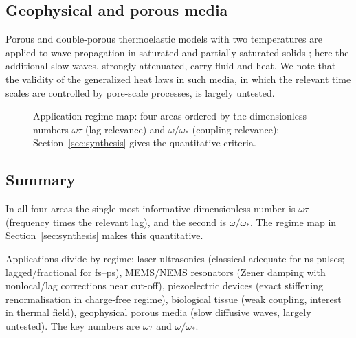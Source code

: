 \subsection{Geophysical and porous media}
Porous and double-porous thermoelastic models with two temperatures are applied to wave propagation in saturated and partially saturated solids \citep{Singh2020,Kumar2022,Kumar2025}; here the additional slow waves, strongly attenuated, carry fluid and heat. We note that the validity of the generalized heat laws in such media, in which the relevant time scales are controlled by pore-scale processes, is largely untested.

\begin{figure}[t!]\centering\small

\caption{Application regime map: four areas ordered by the dimensionless numbers $\omega\tau$ (lag relevance) and $\omega/\omega_*$ (coupling relevance); Section~\ref{sec:synthesis} gives the quantitative criteria.}\label{fig:applications-geo}
\end{figure}

\subsection{Summary}
In all four areas the single most informative dimensionless number is $\omega\tau$ (frequency times the relevant lag), and the second is $\omega/\omega_*$. The regime map in Section~\ref{sec:synthesis} makes this quantitative.

\begin{summarybox}[Summary]
Applications divide by regime: laser ultrasonics (classical adequate for ns pulses; lagged/fractional for fs--ps), MEMS/NEMS resonators (Zener damping with nonlocal/lag corrections near cut-off), piezoelectric devices (exact stiffening renormalisation in charge-free regime), biological tissue (weak coupling, interest in thermal field), geophysical porous media (slow diffusive waves, largely untested). The key numbers are $\omega\tau$ and $\omega/\omega_*$.
\end{summarybox}
